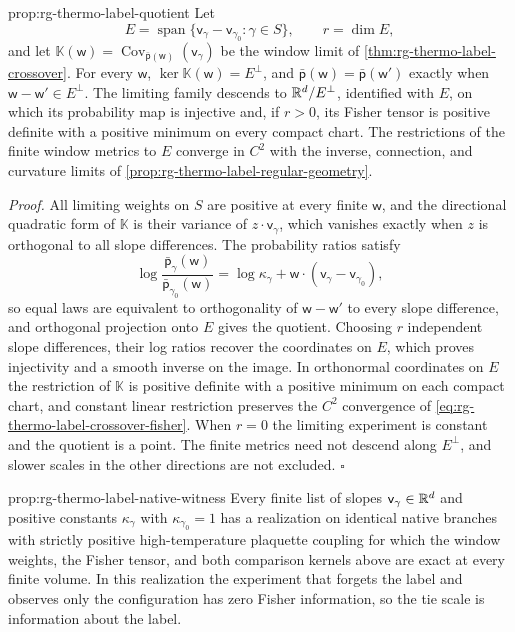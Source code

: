 {prop:rg-thermo-label-quotient}
Let
\begin{equation}
 E=\operatorname{span}\{\mathsf v_\gamma-\mathsf v_{\gamma_0}:\gamma\in S\},
 \qquad r=\dim E,
 \label{eq:rg-thermo-label-slope-space}
\end{equation}
and let $\mathbb K(\mathsf w)=\operatorname{Cov}_{\bar{\mathsf p}(\mathsf w)}(\mathsf v_\gamma)$
be the window limit of \cref{thm:rg-thermo-label-crossover}. For every
$\mathsf w$, $\ker\mathbb K(\mathsf w)=E^\perp$, and
$\bar{\mathsf p}(\mathsf w)=\bar{\mathsf p}(\mathsf w')$ exactly when
$\mathsf w-\mathsf w'\in E^\perp$. The limiting family descends to
$\mathbb R^d/E^\perp$, identified with $E$, on which its probability map is
injective and, if $r>0$, its Fisher tensor is positive definite with a
positive minimum on every compact chart. The restrictions of the finite window
metrics to $E$ converge in $C^2$ with the inverse, connection, and curvature
limits of \cref{prop:rg-thermo-label-regular-geometry}. 

\noindent\emph{Proof.}
All limiting weights on $S$ are positive at every finite $\mathsf w$, and the
directional quadratic form of $\mathbb K$ is their variance of
$z\cdot\mathsf v_\gamma$, which vanishes exactly when $z$ is orthogonal to all
slope differences. The probability ratios satisfy
\begin{equation}
 \log\frac{\bar{\mathsf p}_\gamma(\mathsf w)}{\bar{\mathsf p}_{\gamma_0}(\mathsf w)}
 =\log\kappa_\gamma+\mathsf w\cdot(\mathsf v_\gamma-\mathsf v_{\gamma_0}),
 \label{eq:rg-thermo-label-quotient-ratios}
\end{equation}
so equal laws are equivalent to orthogonality of $\mathsf w-\mathsf w'$ to
every slope difference, and orthogonal projection onto $E$ gives the
quotient. Choosing $r$ independent slope differences, their log ratios recover
the coordinates on $E$, which proves injectivity and a smooth inverse on the
image. In orthonormal coordinates on $E$ the restriction of $\mathbb K$ is
positive definite with a positive minimum on each compact chart, and constant
linear restriction preserves the $C^2$ convergence of
\cref{eq:rg-thermo-label-crossover-fisher}. When $r=0$ the limiting
experiment is constant and the quotient is a point. The finite metrics need
not descend along $E^\perp$, and slower scales in the other directions are not
excluded. $\square$

{prop:rg-thermo-label-native-witness}
Every finite list of slopes $\mathsf v_\gamma\in\mathbb R^d$ and positive constants
$\kappa_\gamma$ with $\kappa_{\gamma_0}=1$ has a realization on identical
native branches with strictly positive high-temperature plaquette coupling
for which the window weights, the Fisher tensor, and both comparison kernels
above are exact at every finite volume. In this realization the experiment
that forgets the label and observes only the configuration has zero Fisher
information, so the tie scale is information about the label.

